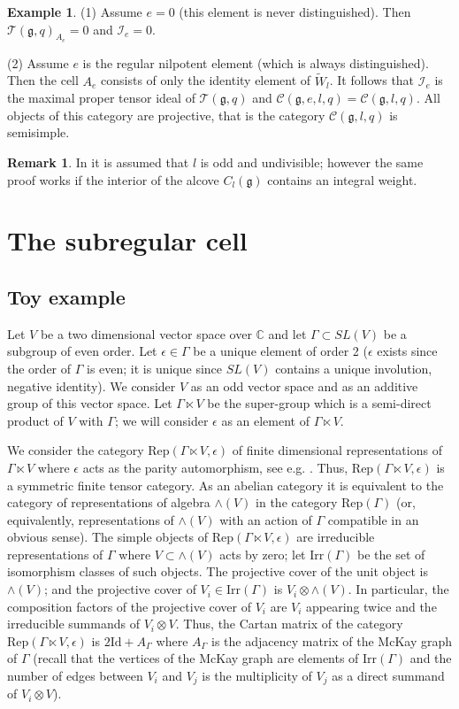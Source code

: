 \documentclass{amsart}
\theoremstyle{definition}
\newtheorem{example}[theorem]{Example}
\newtheorem{remark}[theorem]{Remark}
\newcommand{\C}{\mathcal{C}}
\newcommand{\g}{\mathfrak{g}}
\newcommand{\T}{\mathcal{T}}
\newcommand{\cI}{\mathcal{I}}
\newcommand{\Rep}{\text{Rep}}
\newcommand{\Irr}{\text{Irr}}
\newcommand{\Id}{\text{Id}}
\numberwithin{equation}{section}
\begin{document}
\begin{example} (1) Assume $e=0$ (this element is never distinguished). Then $\T(\g,q)_{A_e}=0$
and $\cI_e=0$.

(2) Assume $e$ is the regular nilpotent element (which is always distinguished). 
Then the cell $A_e$ consists of only the identity element of $\tilde W_l$. It follows that $\cI_e$ is the maximal
proper tensor ideal of $\T(\g,q)$ and  $\C(\g,e,l,q)=\C(\g,l,q)$. All objects of this category
are projective, that is the category $\C(\g,l,q)$ is semisimple.
\end{example}

\begin{remark} In \cite{Ost1} it is assumed that $l$ is odd and undivisible; however the same proof works
if the interior of the alcove $C_l(\g)$ contains an integral weight. 
\end{remark}

\section{The subregular cell}
\subsection{Toy example}\label{toy}
Let $V$ be a two dimensional vector space over $\mathbb C$ and let $\Gamma \subset
SL(V)$ be a subgroup of even order. Let $\epsilon \in \Gamma$ be a unique element of order 2 ($\epsilon$ exists
since the order of $\Gamma$ is even; it is unique since $SL(V)$ contains a unique involution, negative identity).
We consider $V$ as an odd vector space and as an additive group of this vector space. Let $\Gamma \ltimes V$
be the super-group which is a semi-direct product of $V$ with $\Gamma$; we will consider $\epsilon$ as
an element of $\Gamma \ltimes V$. 

We consider the category $\Rep(\Gamma \ltimes V, \epsilon)$ of
finite dimensional representations of $\Gamma \ltimes V$ where $\epsilon$ acts as the parity automorphism,
see e.g. \cite[9.11]{EGNO}. Thus, $\Rep(\Gamma \ltimes V, \epsilon)$ is a symmetric finite tensor category.
As an abelian category it is equivalent to the  category of representations of algebra
$\wedge(V)$ in the category $\Rep(\Gamma)$ (or, equivalently, representations of $\wedge(V)$ with an action
of $\Gamma$  compatible in an obvious sense). The simple objects of $\Rep(\Gamma \ltimes V, \epsilon)$ are irreducible representations of $\Gamma$ where $V\subset \wedge(V)$ acts by zero;
let $\Irr(\Gamma)$ be the set of isomorphism classes of such objects.
The projective cover of the unit object is $\wedge(V)$; and the projective cover of $V_i\in \Irr(\Gamma)$
is $V_i\otimes \wedge(V)$. In particular, the composition factors of the projective cover of $V_i$ are
$V_i$ appearing twice and the irreducible summands of $V_i\otimes V$. Thus, the Cartan matrix of
the category $\Rep(\Gamma \ltimes V, \epsilon)$ is $2\Id+A_\Gamma$ where $A_\Gamma$ is the adjacency
matrix of the McKay graph of $\Gamma$ (recall that the vertices of the McKay graph are elements 
of $\Irr(\Gamma)$ and the number of edges between $V_i$ and $V_j$ is the multiplicity of $V_j$ as 
a direct summand of $V_i\otimes V$). 
\end{document}
